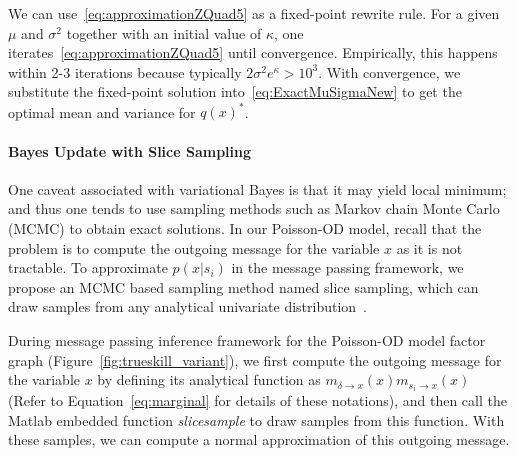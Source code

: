 We can use~\eqref{eq:approximationZQuad5}
as a fixed-point rewrite rule.
For a given $\mu$ and $\sigma^2$ together with an initial value of
$\kappa$, one iterates~\eqref{eq:approximationZQuad5} until
convergence.  Empirically, this happens within 2-3 iterations
because typically $2 \sigma^2 e^\kappa>10^3$.
With convergence, we substitute the fixed-point solution
into~\eqref{eq:ExactMuSigmaNew} to get the optimal mean
and variance for $q(x)^*$.

\paragraph{\bf Bayes Update with Slice Sampling}
One caveat associated with variational Bayes is that it may yield local minimum; and thus one tends to use sampling methods such as Markov chain Monte Carlo (MCMC) to obtain exact solutions. In our Poisson-OD model, recall that the problem is to compute the outgoing message for the variable $x$ as it is not tractable. To approximate $p(x|s_i)$ in the message passing framework, we propose an MCMC based sampling method named slice sampling, which can draw samples from any analytical univariate distribution~\cite{neal03SliceSampling}.

During message passing inference framework for the Poisson-OD model factor graph (Figure~\ref{fig:trueskill_variant}), we first compute the outgoing message for the variable $x$ by defining its analytical function as $m_{\delta \rightarrow x}(x) m_{s_i \rightarrow x}(x)$ (Refer to Equation~\ref{eq:marginal} for details of these notations), and then call the Matlab embedded function \emph{slicesample} to draw samples from this function. With these samples, we can compute a normal approximation of this outgoing message. 


